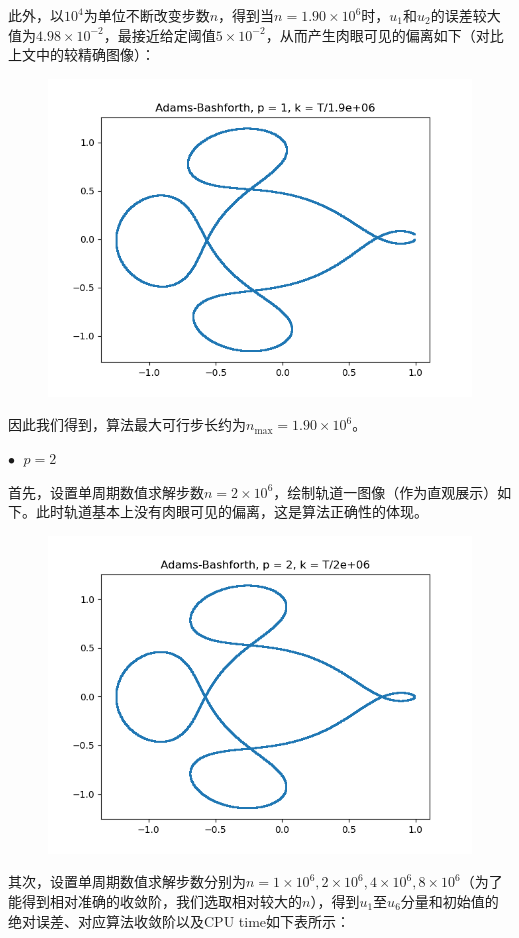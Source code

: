 \documentclass{ctexart}
\begin{document}
\begin{sloppypar}
此外，以$10^4$为单位不断改变步数$n$，得到当$n = 1.90 \times 10^6$时，$u_1$和$u_2$的误差较大值为$4.98 \times 10^{-2}$，最接近给定阈值$5 \times 10^{-2}$，从而产生肉眼可见的偏离如下（对比上文中的较精确图像）：
\begin{figure}[H]
\centering
\includegraphics[scale = 0.45]{./report_src/Figure_2.png}
\end{figure}
因此我们得到，算法最大可行步长约为$n_{\max} = 1.90 \times 10^6$。

$\bullet \;$ $p = 2$

首先，设置单周期数值求解步数$n = 2 \times 10^6$，绘制轨道一图像（作为直观展示）如下。此时轨道基本上没有肉眼可见的偏离，这是算法正确性的体现。
\begin{figure}[H]
\centering
\includegraphics[scale = 0.45]{./report_src/Figure_3.png}
\end{figure}
其次，设置单周期数值求解步数分别为$n = 1 \times 10^6,2 \times 10^6,4 \times 10^6, 8 \times 10^6$（为了能得到相对准确的收敛阶，我们选取相对较大的$n$），得到$u_1$至$u_6$分量和初始值的绝对误差、对应算法收敛阶以及CPU time如下表所示：


\end{sloppypar}
\end{document}

